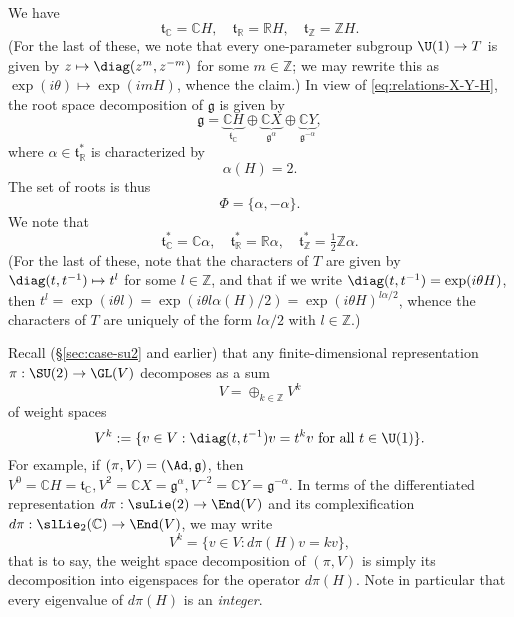 \documentclass[reqno]{amsart} 
\begin{document}
We have
\begin{equation*}
  \mathfrak{t}_{\mathbb{C}} = \mathbb{C} H, \quad \mathfrak{t}_{\mathbb{R}} = \mathbb{R} H, \quad \mathfrak{t}_{\mathbb{Z}} = \mathbb{Z} H.
\end{equation*}
(For the last of these, we note that every one-parameter subgroup $\U(1) \rightarrow T$ is given by $z \mapsto \diag(z^m, z^{-m})$ for some $m \in \mathbb{Z}$; we may rewrite this as $\exp(i \theta) \mapsto \exp(i m H)$, whence the claim.)  In view of \eqref{eq:relations-X-Y-H}, the root space decomposition of $\mathfrak{g}$ is given by
\begin{equation}\label{eq:}
  \mathfrak{g} =
  \underbrace{\mathbb{C} H}_{\mathfrak{t}_{\mathbb{C}}}
  \oplus
  \underbrace{\mathbb{C} X}_{\mathfrak{g}^{\alpha}}
  \oplus
  \underbrace{\mathbb{C} Y}_{\mathfrak{g}^{-\alpha}},
\end{equation}
where $\alpha \in \mathfrak{t} _{\mathbb{R} }^*$ is characterized by
\begin{equation}\label{eq:}
  \alpha(H) = 2.
\end{equation}
The set of roots is thus
\begin{equation}\label{eq:}
  \Phi = \{\alpha, - \alpha\}.
\end{equation}
We note that
\begin{equation}\label{eq:}
  \mathfrak{t}_{\mathbb{C}}^* = \mathbb{C} \alpha,
  \quad
  \mathfrak{t}_{\mathbb{R}}^* = \mathbb{R} \alpha,
  \quad
  \mathfrak{t}_{\mathbb{Z}}^*
  =  \tfrac{1}{2}\mathbb{Z} \alpha.
\end{equation}
(For the last of these, note that the characters of $T$ are given by $\diag(t,t^{-1}) \mapsto t^{l}$ for some $l \in \mathbb{Z}$, and that if we write $\diag(t,t^{-1}) = \exp(i \theta H)$, then $t^l = \exp(i \theta l) = \exp(i \theta l \alpha(H)/2) = \exp(i \theta H)^{l \alpha/2}$, whence the characters of $T$ are uniquely of the form $l \alpha/2$ with $l \in \mathbb{Z}$.)

Recall (\S\ref{sec:case-su2} and earlier) that any finite-dimensional representation $\pi : \SU(2) \rightarrow \GL(V)$ decomposes as a sum
\begin{equation*}
  V = \oplus_{k \in \mathbb{Z}} V^k
\end{equation*}
of weight spaces
\begin{equation*}
  V^k := \{v \in V : \diag(t,t^{-1}) v = t^k v \text{ for all } t \in \U(1) \}.
\end{equation*}
For example, if $(\pi,V) = (\Ad,\mathfrak{g})$, then $V^0 = \mathbb{C} H = \mathfrak{t}_{\mathbb{C}}, V^2 = \mathbb{C} X = \mathfrak{g}^{\alpha}, V^{-2} = \mathbb{C} Y = \mathfrak{g}^{-\alpha}$.  In terms of the differentiated representation $d \pi : \suLie(2) \rightarrow \End(V)$ and its complexification $d \pi : \slLie_2(\mathbb{C}) \rightarrow \End(V)$, we may write
\begin{equation*}
  V^k = \{v \in V : d \pi(H) v = k v \},
\end{equation*}
that is to say, the weight space decomposition of $(\pi,V)$ is simply its decomposition into eigenspaces for the operator $d \pi(H)$.  Note in particular that every eigenvalue of $d \pi(H)$ is an \emph{integer}.
\end{document}
